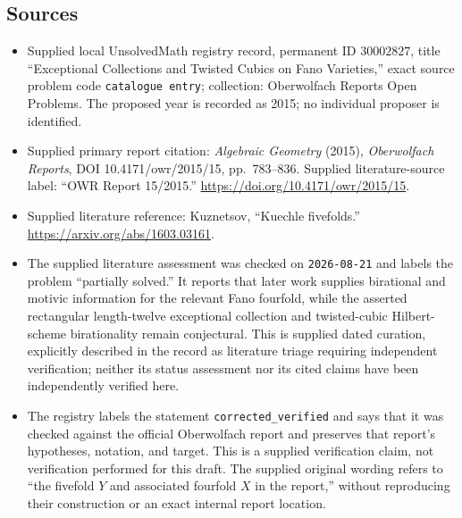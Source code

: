 \documentclass[11pt]{article}
\begin{document}
\subsection{Sources}
\begin{itemize}
\item Supplied local UnsolvedMath registry record, permanent ID \(30002827\), title ``Exceptional Collections and Twisted Cubics on Fano Varieties,'' exact source problem code \texttt{catalogue entry}; collection: Oberwolfach Reports Open Problems. The proposed year is recorded as 2015; no individual proposer is identified.
\item Supplied primary report citation: \emph{Algebraic Geometry} (2015), \emph{Oberwolfach Reports}, DOI 10.4171/owr/2015/15, pp.\ 783--836. Supplied literature-source label: ``OWR Report 15/2015.'' \url{https://doi.org/10.4171/owr/2015/15}.
\item Supplied literature reference: Kuznetsov, ``Kuechle fivefolds.'' \url{https://arxiv.org/abs/1603.03161}.
\item The supplied literature assessment was checked on \texttt{2026-08-21} and labels the problem ``partially solved.'' It reports that later work supplies birational and motivic information for the relevant Fano fourfold, while the asserted rectangular length-twelve exceptional collection and twisted-cubic Hilbert-scheme birationality remain conjectural. This is supplied dated curation, explicitly described in the record as literature triage requiring independent verification; neither its status assessment nor its cited claims have been independently verified here.
\item The registry labels the statement \texttt{corrected\_verified} and says that it was checked against the official Oberwolfach report and preserves that report's hypotheses, notation, and target. This is a supplied verification claim, not verification performed for this draft. The supplied original wording refers to ``the fivefold \(Y\) and associated fourfold \(X\) in the report,'' without reproducing their construction or an exact internal report location.
\end{itemize}
\end{document}
